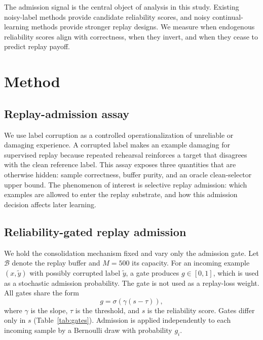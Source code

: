 \documentclass[preprint,12pt]{elsarticle}
\begin{document}
The admission signal is the central object of analysis in this study. Existing noisy-label methods provide candidate reliability scores, and noisy continual-learning methods provide stronger replay designs. We measure when endogenous reliability scores align with correctness, when they invert, and when they cease to predict replay payoff.

\section{Method}

\subsection{Replay-admission assay}

We use label corruption as a controlled operationalization of unreliable or damaging experience. A corrupted label makes an example damaging for supervised replay because repeated rehearsal reinforces a target that disagrees with the clean reference label. This assay exposes three quantities that are otherwise hidden: sample correctness, buffer purity, and an oracle clean-selector upper bound. The phenomenon of interest is selective replay admission: which examples are allowed to enter the replay substrate, and how this admission decision affects later learning.

\subsection{Reliability-gated replay admission}

We hold the consolidation mechanism fixed and vary only the admission gate. Let $\mathcal{B}$ denote the replay buffer and $M=500$ its capacity. For an incoming example $(x,\tilde{y})$ with possibly corrupted label $\tilde{y}$, a gate produces $g\in[0,1]$, which is used as a stochastic admission probability. The gate is not used as a replay-loss weight. All gates share the form
\begin{equation}
g = \sigma\left(\gamma(s-\tau)\right),
\label{eq:gate}
\end{equation}
where $\gamma$ is the slope, $\tau$ is the threshold, and $s$ is the reliability score. Gates differ only in $s$ (Table~\ref{tab:gates}). Admission is applied independently to each incoming sample by a Bernoulli draw with probability $g_i$.
\end{document}
